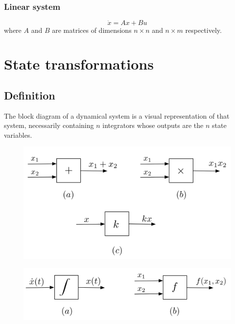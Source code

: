\documentclass[12pt, openany]{report}
\theoremstyle{definition}
\begin{document}
\subsection{Linear system}
\begin{equation}
    \dot x = Ax + Bu
\end{equation}
where \(A\) and \(B\) are matrices of dimensions \(n\times n\) and \(n\times m\) respectively. 
\chapter{State transformations}
\section{Definition}
The block diagram of a dynamical system is a visual representation of that system, necessarily containing \(n\) integrators whose outputs are the \(n\) state variables. \\
\begin{minipage}{.5\textwidth}
    \begin{figure}[H]
        \centering
        \includegraphics[width = \textwidth]{img/block_1.png}
    \end{figure}
\end{minipage}
\begin{minipage}{.5\textwidth}
    \begin{figure}[H]
        \centering
        \includegraphics[width = \textwidth]{img/block_2.png}
    \end{figure}
\end{minipage}
\end{document}
